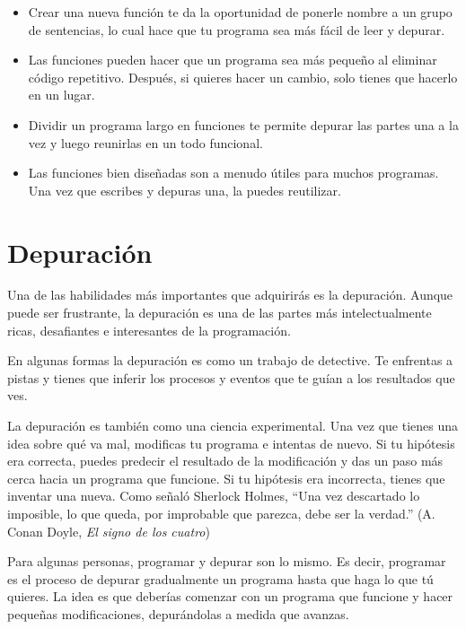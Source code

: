 \documentclass[10pt]{book}
\begin{document}
\begin{itemize}

\item Crear una nueva función te da la oportunidad de ponerle nombre a un grupo
de sentencias, lo cual hace que tu programa sea más fácil de leer y depurar.

\item Las funciones pueden hacer que un programa sea más pequeño al eliminar código
repetitivo.  Después, si quieres hacer un cambio, solo tienes
que hacerlo en un lugar.

\item Dividir un programa largo en funciones te permite depurar las
partes una a la vez y luego reunirlas en un todo funcional.

\item Las funciones bien diseñadas son a menudo útiles para muchos programas.
Una vez que escribes y depuras una, la puedes reutilizar.

\end{itemize}


\section{Depuración}

Una de las habilidades más importantes que adquirirás es la depuración.
Aunque puede ser frustrante, la depuración es una de las partes más
intelectualmente ricas, desafiantes e interesantes de
la programación.

En algunas formas la depuración es como un trabajo de detective.  Te enfrentas
a pistas y tienes que inferir los procesos y eventos que te guían
a los resultados que ves.

La depuración es también como una ciencia experimental.  Una vez que tienes una idea
sobre qué va mal, modificas tu programa e intentas de nuevo.  Si
tu hipótesis era correcta, puedes predecir el resultado de la
modificación y das un paso más cerca hacia un programa que funcione.  Si
tu hipótesis era incorrecta, tienes que inventar una nueva.  Como
señaló Sherlock Holmes, ``Una vez descartado lo
imposible, lo que queda, por improbable que parezca, debe ser la verdad.''
(A. Conan Doyle, {\em El signo de los cuatro})

Para algunas personas, programar y depurar son lo mismo.  Es
decir, programar es el proceso de depurar gradualmente un programa hasta que
haga lo que tú quieres.  La idea es que deberías comenzar con un
programa que funcione y hacer pequeñas modificaciones,
depurándolas a medida que avanzas.
\end{document}

